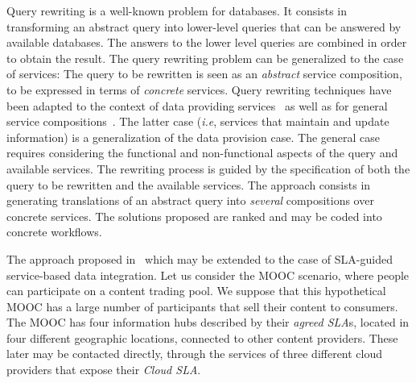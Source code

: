 

Query rewriting is a well-known problem for databases.
It consists in transforming an abstract query into lower-level queries that can be answered by available databases.
The answers to the lower level queries are combined in order to obtain the result.
The query rewriting problem can be generalized to the case of services:
The query to be rewritten is seen as an \textit{abstract} service composition, to be expressed in terms of \textit{concrete} services.
Query rewriting techniques have been adapted to the context of data providing services~\cite{BBM10,ZLC11} as well as for general service compositions~\cite{CostaAMR13}. 
The latter case (\textit{i.e}, services that maintain and update information) is a generalization of the data provision case.
The general case requires considering the functional and non-functional aspects of the query and available services.
The rewriting process is guided by the specification of both the query to be rewritten and the available services.
The approach consists in generating translations of an abstract query into \textit{several}  compositions over concrete  services. 
The solutions proposed are ranked and may be coded into concrete workflows.

The approach proposed in~\cite{CostaAMR13} which may be extended to the case of SLA-guided service-based data integration. 
%
Let us consider the MOOC scenario, where people can participate on a content trading pool.
We suppose that this hypothetical MOOC has a large number of participants that sell their content  to  consumers. 
The MOOC has four information hubs described by their {\em agreed SLA}s, located in four different geographic locations, connected to other content providers.
These later may be  contacted directly, through the services of three different cloud providers that expose their {\em Cloud SLA}.

